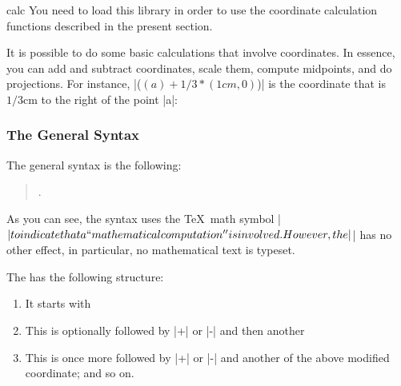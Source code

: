 \begin{tikzlibrary}{calc}
    You need to load this library in order to use the coordinate calculation
    functions described in the present section.
\end{tikzlibrary}

It is possible to do some basic calculations that involve coordinates. In
essence, you can add and subtract coordinates, scale them, compute midpoints,
and do projections. For instance, |($(a) + 1/3*(1cm,0)$)| is the coordinate
that is $1/3 \text{cm}$ to the right of the point |a|:
%
\begin{codeexample}[preamble={\usetikzlibrary{calc}}]
\end{codeexample}


\subsubsection{The General Syntax}

The general syntax is the following:
%
\begin{quote}
    .
\end{quote}

As you can see, the syntax uses the \TeX\ math symbol |$| to %
indicate that a ``mathematical computation'' is involved. However, the |$| %
has no other effect, in particular, no mathematical text is typeset.

The  has the following structure:
%
\begin{enumerate}
    \item It starts with
        \begin{quote}
        \end{quote}
    \item This is optionally followed by |+| or |-| and then another
        \begin{quote}
        \end{quote}
    \item This is once more followed by |+| or |-| and another of the above
        modified coordinate; and so on.
\end{enumerate}

